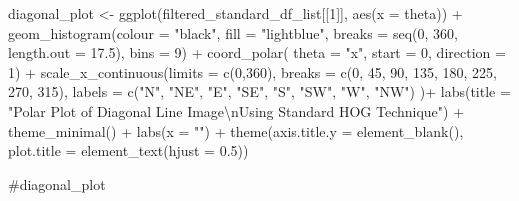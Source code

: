 \documentclass[
  letterpaper,
  DIV=11,
  numbers=noendperiod]{scrreprt}
\newenvironment{Shaded}{\begin{snugshade}}{\end{snugshade}}
\newcommand{\AttributeTok}[1]{\textcolor[rgb]{0.40,0.45,0.13}{#1}}
\newcommand{\CommentTok}[1]{\textcolor[rgb]{0.37,0.37,0.37}{#1}}
\newcommand{\DecValTok}[1]{\textcolor[rgb]{0.68,0.00,0.00}{#1}}
\newcommand{\FloatTok}[1]{\textcolor[rgb]{0.68,0.00,0.00}{#1}}
\newcommand{\FunctionTok}[1]{\textcolor[rgb]{0.28,0.35,0.67}{#1}}
\newcommand{\NormalTok}[1]{\textcolor[rgb]{0.00,0.23,0.31}{#1}}
\newcommand{\OtherTok}[1]{\textcolor[rgb]{0.00,0.23,0.31}{#1}}
\newcommand{\SpecialCharTok}[1]{\textcolor[rgb]{0.37,0.37,0.37}{#1}}
\newcommand{\StringTok}[1]{\textcolor[rgb]{0.13,0.47,0.30}{#1}}
\begin{document}
\begin{Shaded}
\begin{Highlighting}[]
\NormalTok{diagonal\_plot }\OtherTok{\textless{}{-}}
  \FunctionTok{ggplot}\NormalTok{(filtered\_standard\_df\_list[[}\DecValTok{1}\NormalTok{]], }
         \FunctionTok{aes}\NormalTok{(}\AttributeTok{x =}\NormalTok{ theta)) }\SpecialCharTok{+}
  \FunctionTok{geom\_histogram}\NormalTok{(}\AttributeTok{colour =} \StringTok{"black"}\NormalTok{, }
                 \AttributeTok{fill =} \StringTok{"lightblue"}\NormalTok{, }
                 \AttributeTok{breaks =} \FunctionTok{seq}\NormalTok{(}\DecValTok{0}\NormalTok{, }\DecValTok{360}\NormalTok{, }\AttributeTok{length.out =} \FloatTok{17.5}\NormalTok{),}
                 \AttributeTok{bins =} \DecValTok{9}\NormalTok{) }\SpecialCharTok{+}
  \FunctionTok{coord\_polar}\NormalTok{(}
    \AttributeTok{theta =} \StringTok{"x"}\NormalTok{, }\AttributeTok{start =} \DecValTok{0}\NormalTok{, }\AttributeTok{direction =} \DecValTok{1}\NormalTok{) }\SpecialCharTok{+}
  \FunctionTok{scale\_x\_continuous}\NormalTok{(}\AttributeTok{limits =} \FunctionTok{c}\NormalTok{(}\DecValTok{0}\NormalTok{,}\DecValTok{360}\NormalTok{),}
    \AttributeTok{breaks =} \FunctionTok{c}\NormalTok{(}\DecValTok{0}\NormalTok{, }\DecValTok{45}\NormalTok{, }\DecValTok{90}\NormalTok{, }\DecValTok{135}\NormalTok{, }\DecValTok{180}\NormalTok{, }\DecValTok{225}\NormalTok{, }\DecValTok{270}\NormalTok{, }\DecValTok{315}\NormalTok{), }
    \AttributeTok{labels =} \FunctionTok{c}\NormalTok{(}\StringTok{"N"}\NormalTok{, }\StringTok{"NE"}\NormalTok{, }\StringTok{"E"}\NormalTok{, }\StringTok{"SE"}\NormalTok{, }\StringTok{"S"}\NormalTok{, }\StringTok{"SW"}\NormalTok{, }\StringTok{"W"}\NormalTok{, }\StringTok{"NW"}\NormalTok{)}
\NormalTok{  )}\SpecialCharTok{+}
  \FunctionTok{labs}\NormalTok{(}\AttributeTok{title =} \StringTok{"Polar Plot of Diagonal Line Image}\SpecialCharTok{\textbackslash{}n}\StringTok{Using Standard HOG Technique"}\NormalTok{) }\SpecialCharTok{+}
  \FunctionTok{theme\_minimal}\NormalTok{() }\SpecialCharTok{+}
  \FunctionTok{labs}\NormalTok{(}\AttributeTok{x =} \StringTok{""}\NormalTok{) }\SpecialCharTok{+}
  \FunctionTok{theme}\NormalTok{(}\AttributeTok{axis.title.y =} \FunctionTok{element\_blank}\NormalTok{(),}
        \AttributeTok{plot.title =} \FunctionTok{element\_text}\NormalTok{(}\AttributeTok{hjust =} \FloatTok{0.5}\NormalTok{))}

\CommentTok{\#diagonal\_plot}
\end{Highlighting}
\end{Shaded}
\end{document}
